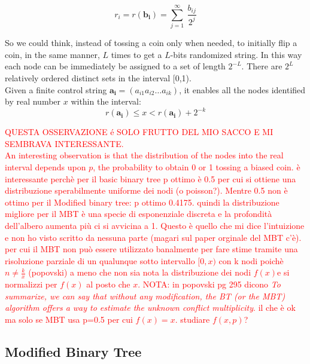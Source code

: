 \documentclass[12pt,a4paper,twocolumns]{report}
\begin{document}
\begin{equation}
r_{i}=r(\mathbf{b_{i}})=\sum_{j=1}^{\infty} \ \frac{b_{ij}}{2^{j}}
\end{equation}

So we could think, instead of tossing a coin only when needed, to initially flip a coin, in the same manner, $L$ times to get a $L$-bits randomized string.
In this way each node can be immediately be assigned to a set of length $2^{-L}$. There are $2^{L}$ relatively ordered distinct sets in the interval [0,1).\\
Given a finite control string $\mathbf{a_{i}}=(a_{i1}a_{i2}\ldots a_{ik})$, it enables all the nodes identified by real number $x$ within the interval:
\begin{equation}
	r(\mathbf{a_{i}})\leq x <r(\mathbf{a_{i}})+2^{-k}
\end{equation}

\textcolor{red}{QUESTA OSSERVAZIONE é SOLO FRUTTO DEL MIO SACCO E MI SEMBRAVA INTERESSANTE.\\
An interesting observation is that the distribution of the nodes into the real interval depends upon $p$, the probability  to obtain 0 or 1 tossing a biased coin.
è interessante perchè per il basic binary tree p ottimo è 0.5 per cui si ottiene una distribuzione sperabilmente uniforme dei nodi (o poisson?). Mentre 0.5 non è ottimo per il Modified binary tree: p ottimo 0.4175. quindi la distribuzione migliore per il MBT è una specie di esponenziale discreta e la profondità dell'albero aumenta più ci si avvicina a 1. Questo è quello che mi dice l'intuizione e non ho visto scritto da nessuna parte (magari sul paper orginale del MBT c'è). per cui il MBT non può essere utilizzato banalmente per fare stime tramite una risoluzione parziale di un qualunque sotto intervallo $[0,x)$ con k nodi poichè $n \neq \frac{k}{x} $ (popovski) a meno che non sia nota la distribuzione dei nodi $f(x) $e si normalizzi per $f(x)$ al posto che $x$. 
NOTA: in popovski pg 295  dicono \emph{To summarize, we can say that without any modification, the BT (or the MBT) algorithm offers a way to estimate the unknown conflict multiplicity}. il che è ok ma solo se MBT usa p=0.5
per cui $f(x)=x$. studiare $f(x,p)$?}
\subsection{Modified Binary Tree}
\end{document}
